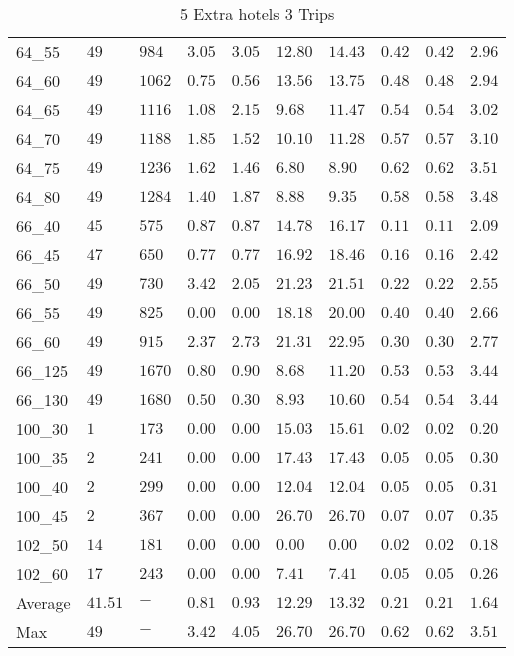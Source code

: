 \begin{center}
\begin{table}[]
\begin{tabular}{|lll|l|l|ll|lll|}
64\_55   & $49  $ & $984 $ & $3.05$ & $3.05$ & $12.80$ & $14.43$ & $0.42$ & $0.42$   & $2.96$ \\
64\_60   & $49  $ & $1062$ & $0.75$ & $0.56$ & $13.56$ & $13.75$ & $0.48$ & $0.48$   & $2.94$ \\
64\_65   & $49  $ & $1116$ & $1.08$ & $2.15$ & $9.68$  & $11.47$ & $0.54$ & $0.54$   & $3.02$ \\
64\_70   & $49  $ & $1188$ & $1.85$ & $1.52$ & $10.10$ & $11.28$ & $0.57$ & $0.57$   & $3.10$ \\
64\_75   & $49  $ & $1236$ & $1.62$ & $1.46$ & $6.80$  & $8.90$  & $0.62$ & $0.62$   & $3.51$ \\
64\_80   & $49  $ & $1284$ & $1.40$ & $1.87$ & $8.88$  & $9.35$  & $0.58$ & $0.58$   & $3.48$ \\
\hline
66\_40   & $45  $ & $575 $ & $0.87$ & $0.87$ & $14.78$ & $16.17$ & $0.11$ & $0.11$   & $2.09$ \\
66\_45   & $47  $ & $650 $ & $0.77$ & $0.77$ & $16.92$ & $18.46$ & $0.16$ & $0.16$   & $2.42$ \\
66\_50   & $49  $ & $730 $ & $3.42$ & $2.05$ & $21.23$ & $21.51$ & $0.22$ & $0.22$   & $2.55$ \\
66\_55   & $49  $ & $825 $ & $\bm{0.00}$ & $\bm{0.00}$ & $18.18$ & $20.00$ & $0.40$ & $0.40$   & $2.66$ \\
66\_60   & $49  $ & $915 $ & $2.37$ & $2.73$ & $21.31$ & $22.95$ & $0.30$ & $0.30$   & $2.77$ \\
66\_125  & $49  $ & $1670$ & $0.80$ & $0.90$ & $8.68$  & $11.20$ & $0.53$ & $0.53$   & $3.44$ \\
66\_130  & $49  $ & $1680$ & $0.50$ & $0.30$ & $8.93$  & $10.60$ & $0.54$ & $0.54$   & $3.44$ \\
\hline
100\_30  & $1   $ & $173 $ & $\bm{0.00}$ & $\bm{0.00}$ & $15.03$ & $15.61$ & $0.02$ & $0.02$   & $0.20$ \\
100\_35  & $2   $ & $241 $ & $\bm{0.00}$ & $\bm{0.00}$ & $17.43$ & $17.43$ & $0.05$ & $0.05$   & $0.30$ \\
100\_40  & $2   $ & $299 $ & $\bm{0.00}$ & $\bm{0.00}$ & $12.04$ & $12.04$ & $0.05$ & $0.05$   & $0.31$ \\
100\_45  & $2   $ & $367 $ & $\bm{0.00}$ & $\bm{0.00}$ & $26.70$ & $26.70$ & $0.07$ & $0.07$   & $0.35$ \\
\hline
102\_50  & $14  $ & $181 $ & $\bm{0.00}$ & $\bm{0.00}$ & $\bm{0.00}$  & $\bm{0.00}$  & $0.02$ & $0.02$   & $0.18$ \\
102\_60  & $17  $ & $243 $ & $\bm{0.00}$ & $\bm{0.00}$ & $7.41$  & $7.41$  & $0.05$ & $0.05$   & $0.26$ \\
\hline
Average & $41.51$ & $-   $ & $0.81$ & $0.93$ & $12.29$ & $13.32$ & $0.21$ & $0.21$   & $1.64$ \\
Max     & $49   $ & $-   $ & $3.42$ & $4.05$ & $26.70$ & $26.70$ & $0.62$ & $0.62$   & $3.51$ \\
\hline
\end{tabular}
\caption{5 Extra hotels 3 Trips}
\label{5-3}
\end{table}
\end{center}
